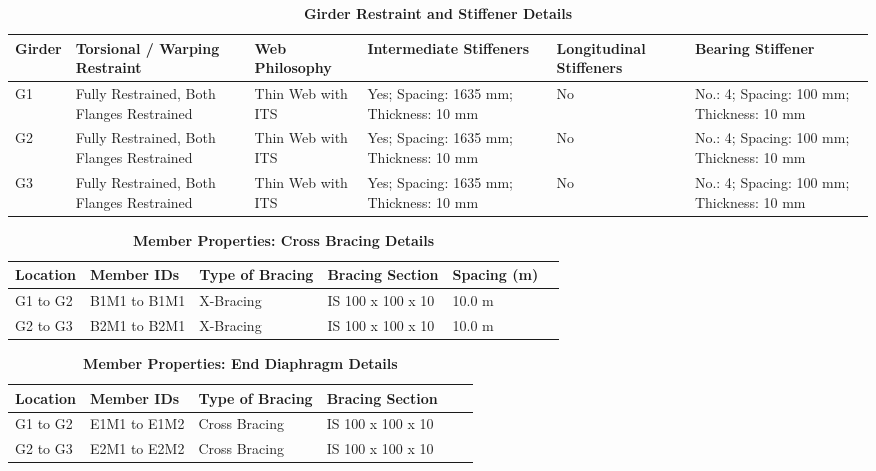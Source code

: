 \documentclass[12pt,a4paper]{report}
\numberwithin{table}{chapter}
\numberwithin{figure}{chapter}
\begin{document}
\vspace{4pt}
\begin{longtable}{|L{1.4cm}|p{2.2cm}|p{2.2cm}|p{3.0cm}|p{2.4cm}|p{2.2cm}|}
\caption{\textbf{Girder Restraint and Stiffener Details}}\\
\hline
\textbf{Girder} & \textbf{Torsional / Warping Restraint} & \textbf{Web Philosophy} & \textbf{Intermediate Stiffeners} & \textbf{Longitudinal Stiffeners} & \textbf{Bearing Stiffener} \\[6pt]
\hline
\endfirsthead
\endhead

G1 & Fully Restrained, Both Flanges Restrained & Thin Web with ITS & Yes; Spacing: 1635 mm; Thickness: 10 mm & No & No.: 4; Spacing: 100 mm; Thickness: 10 mm \\[8pt]
\hline
G2 & Fully Restrained, Both Flanges Restrained & Thin Web with ITS & Yes; Spacing: 1635 mm; Thickness: 10 mm & No & No.: 4; Spacing: 100 mm; Thickness: 10 mm \\[8pt]
\hline
G3 & Fully Restrained, Both Flanges Restrained & Thin Web with ITS & Yes; Spacing: 1635 mm; Thickness: 10 mm & No & No.: 4; Spacing: 100 mm; Thickness: 10 mm \\[8pt]
\hline
\end{longtable}



\newpage

\vspace{0.4em}
\setlength{\tabcolsep}{4pt}
\setlength\LTleft{0pt}
\setlength\LTright{\fill}

\begin{longtable}{|L{2.2cm}|L{2.2cm}|L{3.0cm}|L{2.5cm}|C{1.8cm}|C{1.8cm}|}
\caption{\textbf{Member Properties: Cross Bracing Details}}
\hline
\textbf{Location} & \textbf{Member IDs} & \textbf{Type of Bracing} & \textbf{Bracing Section} & \textbf{Spacing (m)} \\
\hline
G1 to G2 & B1M1 to B1M1 & X-Bracing & IS 100 x 100 x 10 & 10.0 m \\[6pt]
\hline
G2 to G3 & B2M1 to B2M1 & X-Bracing & IS 100 x 100 x 10 & 10.0 m \\[6pt]
\hline
\end{longtable}

\vspace{0.4em}
\noindent
\setlength{\tabcolsep}{4pt}
\setlength\LTleft{0pt}
\setlength\LTright{\fill}

\begin{longtable}{|L{2.2cm}|L{2.2cm}|L{3.0cm}|L{2.5cm}|C{1.8cm}|C{1.8cm}|}
\caption{\textbf{Member Properties: End Diaphragm Details}}
\hline
\textbf{Location} & \textbf{Member IDs} & \textbf{Type of Bracing} & \textbf{Bracing Section} \\
\hline
G1 to G2 & E1M1 to E1M2 & Cross Bracing & IS 100 x 100 x 10 \\[6pt]
\hline
G2 to G3 & E2M1 to E2M2 & Cross Bracing & IS 100 x 100 x 10 \\[6pt]
\hline
\end{longtable}
\end{document}
